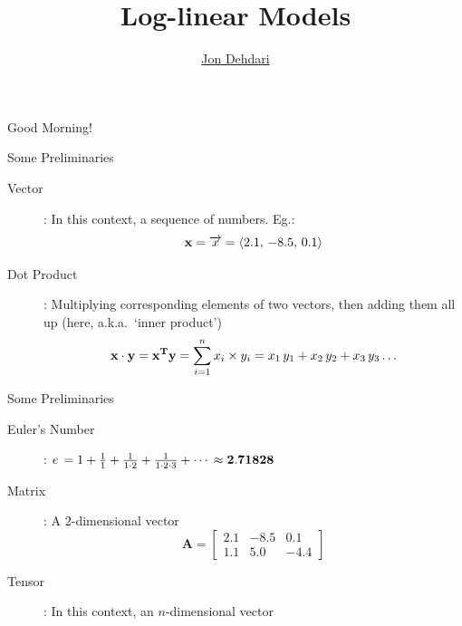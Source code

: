\documentclass[xcolor=pdftex,x11names,table,hyperref]{beamer}
\begin{document}
\title{Log-linear Models \\[1.5em]
 }
\author{\href{http://jon.dehdari.org}{Jon Dehdari}}
\frame{\titlepage}

\begin{frame}{Good Morning!}
	\begin{center}
	\end{center}
\end{frame}

\begin{frame}{Some Preliminaries}
\begin{description}
	\item[Vector]: In this context, a sequence of numbers. Eg.:
	\begin{equation*}
	{\bf x} = \overrightarrow{x} = \langle 2.1, \, -8.5, \, 0.1 \rangle
	\end{equation*}
	\pause
	\item[Dot Product]: Multiplying corresponding elements of two vectors, then adding them all up (here, a.k.a.\ `inner product')
	\begin{equation*}
	{\bf x \cdot y} = {\bf x^Ty} =  \sum_{i=1}^n x_i \times y_i = x_1 \, y_1 + x_2 \, y_2 + x_3 \, y_3 \ldots
	\end{equation*}
\end{description}
\end{frame}

\begin{frame}{Some Preliminaries}
\begin{description}
	\item[Euler's Number]: $e \, = 1 + \frac{1}{1} + \frac{1}{1\cdot 2} + \frac{1}{1\cdot 2\cdot 3} + \cdots \, \approx {\bf 2.71828} $
	\pause
	\item[Matrix]: A 2-dimensional vector
	\begin{equation*}
	{\boldsymbol A} =
	\begin{bmatrix}
	2.1 & -8.5 & 0.1 \\
	1.1 & 5.0 & -4.4
	 \end{bmatrix}
	\end{equation*}
	\pause
	\item[Tensor]: In this context, an $n$-dimensional vector
\end{description}
\end{frame}
\end{document}
